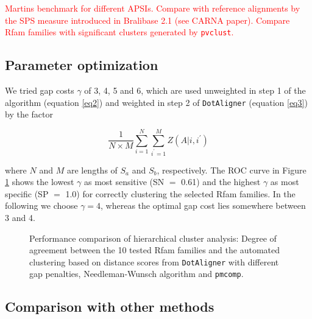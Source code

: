\documentclass[a4paper,twoside]{article}
\newcommand\dotaligner{\texttt{DotAligner}}
\newcommand\pmcomp{\texttt{pmcomp}}
\newcommand\pvclust{\texttt{pvclust}}
\newcommand{\RED}[1]{\textcolor{red}{#1}}
\begin{document}
\RED{Martins benchmark for different APSIs. Compare with reference alignments by
the SPS measure introduced in Bralibase 2.1 (see CARNA paper). Compare Rfam
families with significant clusters generated by \pvclust.}


\subsection{Parameter optimization}

\noindent We tried gap costs $\gamma$ of 3, 4, 5 and 6, which are used
unweighted in step 1 of the algorithm (equation \ref{eq2}) and weighted in step
2 of \dotaligner{} (equation \ref{eq3}) by the factor 

\begin{equation}\label{eq6}
	\frac{1}{N \times M} \sum_{i=1}^{N} \sum_{i^\prime=1}^{M} Z(A|i,i^\prime)
\end{equation}

where $N$ and $M$ are lengths of $S_a$ and $S_b$, respectively. The ROC curve in
Figure \ref{fig:roc} shows the lowest $\gamma$ as most sensitive (SN $=$ 0.61)
and the highest $\gamma$ as most specific (SP $=$ 1.0) for correctly clustering
the selected Rfam families. In the following we choose $\gamma=4$, whereas the
optimal gap cost lies somewhere between 3 and 4.

\begin{figure}[!h]
  \centering
    {}
  \caption{Performance comparison of hierarchical cluster analysis: Degree of
  agreement between the 10 tested Rfam families and the automated clustering
  based on distance scores from \dotaligner{} with different gap penalties,
  Needleman-Wunsch algorithm and \pmcomp{}.}
  \label{fig:roc}
\end{figure}



\subsection{Comparison with other methods}
\end{document}
